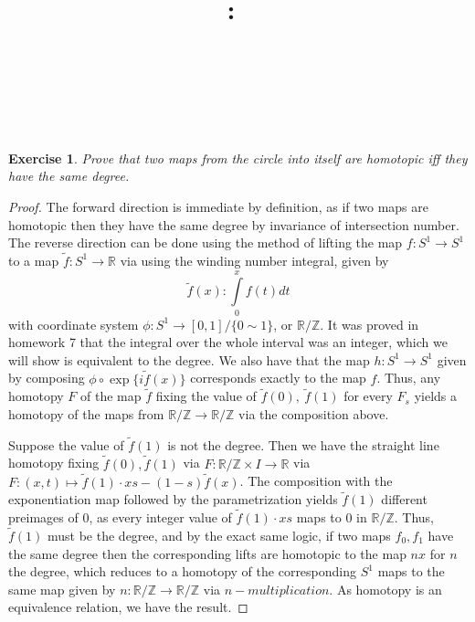 \documentclass{article}
\title{
    \vspace{2in}
    \textmd{\textbf{\hmwkClass:\ \hmwkTitle}}\\
    \vspace{0.1in}
    \textmd{\hmwkDueDate} \\
    \vspace{0.2in}\large{\textit{\hmwkClassInstructor\  }}
    \vspace{2in}
}
\author{\hmwkAuthorName}
\date{}
\newtheorem{exercise}{Exercise}
\begin{document}
\maketitle

\pagebreak

\begin{exercise}
  Prove that two maps from the circle into itself are homotopic iff they have the same degree.
\end{exercise}

\begin{proof}
  The forward direction is immediate by definition, as if two maps are homotopic then they have the same degree by invariance of intersection number. The reverse direction can be done using the method of lifting the map $f: S^{1} \to S^{1}$ to a map $\widetilde f: S^{1} \to \mathbb{R}$ via using the winding number integral, given by \[ \widetilde f(x) : \int\limits_{0}^{x}f(t) dt\]  with coordinate system $\phi: S^{1} \to [0,1]/\{0 \sim 1\}$, or $\mathbb{R}/\mathbb{Z}$. It was proved in homework 7 that the integral over the whole interval was an integer, which we will show is equivalent to the degree. We also have that the map $h: S^{1} \to S^{1}$ given by composing $\phi \circ \exp\{i \widetilde f(x)\}$ corresponds exactly to the map $f$. Thus, any homotopy $F$ of the map $\widetilde f$ fixing the value of $\widetilde f(0), \ \widetilde f(1)$ for every $F_{s}$ yields a homotopy of the maps from $\mathbb{R}/\mathbb{Z} \to \mathbb{R}/\mathbb{Z}$ via the composition above. 
  
  Suppose the value of $\widetilde f(1)$ is not the degree. Then we have the straight line homotopy fixing $\widetilde f(0), \widetilde f(1)$ via $F: \mathbb{R}/\mathbb{Z} \times I \to \mathbb{R}$ via $F: (x,t) \mapsto \widetilde f(1) \cdot x s - (1 - s) \widetilde f(x)$. The composition with the exponentiation map followed by the parametrization yields $\widetilde f(1)$ different preimages of $0$, as every integer value of $\widetilde f(1)\cdot xs$ maps to $0$ in $\mathbb{R}/\mathbb{Z}$. Thus, $\widetilde f(1)$ must be the degree, and by the exact same logic, if two maps $f_{0}, f_{1}$ have the same degree then the corresponding lifts are homotopic to the map $nx$ for $n$ the degree, which reduces to a homotopy of the corresponding $S^{1}$ maps to the same map given by $n: \mathbb{R}/\mathbb{Z} \to \mathbb{R}/\mathbb{Z}$ via $n-multiplication$. As homotopy is an equivalence relation, we have the result. 
\end{proof}
\end{document}
